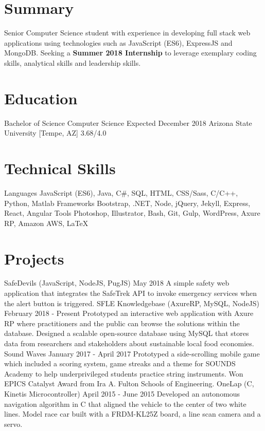 \section{Summary}
\sectionStart
  \summaryText
  {Senior Computer Science student with experience in developing full stack web applications using technologies such as JavaScript (ES6), ExpressJS and MongoDB. Seeking a \textbf{Summer 2018 Internship} to leverage exemplary coding skills, analytical skills and leadership skills.}
\sectionEnd

\section{Education}
\sectionStart
  \educationItem
    {Bachelor of Science}
    {Computer Science}
    {Expected December 2018}
    {Arizona State University [Tempe, AZ]}
    {3.68/4.0}
\sectionEnd

\section{Technical Skills}
\sectionStart
  \skillItem
    {Languages}
    {JavaScript (ES6), Java, C\#, SQL, HTML, CSS/Sass, C/C++, Python, Matlab}
  \skillItem
    {Frameworks}
    {Bootstrap, .NET, Node, jQuery, Jekyll, Express, React, Angular}
  \skillItem
    {Tools}
    {Photoshop, Illustrator, Bash, Git, Gulp, WordPress, Axure RP, Amazon AWS, \LaTeX\ }
  \vspace{3pt}
\sectionEnd

\section{Projects}
\sectionStart
  \projectHeading
    {}
    {SafeDevils}
    {(JavaScript, NodeJS, PugJS)}
    {May 2018}
  \listStart
    \bulletItem
      {A simple safety web application that integrates the SafeTrek API to invoke emergency services when the alert button is triggered.}
  \listEnd
  \projectHeading
    {}
    {SFLE Knowledgebase}
    {(AxureRP, MySQL, NodeJS)}
    {February 2018 - Present}
  \listStart
    \bulletItem
      {Prototyped an interactive web application with Axure RP where practitioners and the public can browse the solutions within the database.}
    \bulletItem
      {Designed a scalable open-source database using MySQL that stores data from researchers and stakeholders about sustainable local food economies.}
  \listEnd
  \projectHeading
    {}
    {Sound Waves}
    {}
    {January 2017 - April 2017}
  \listStart
    \bulletItem
      {Prototyped a side-scrolling mobile game which included a scoring system, game streaks and a theme for SOUNDS Academy to help underprivileged students practice string instruments.}
    \bulletItem
      {Won EPICS Catalyst Award from Ira A. Fulton Schools of Engineering.}
  \listEnd
  \projectHeading
    {}
    {OneLap}
    {(C, Kinetis Microcontroller)}
    {April 2015 - June 2015}
  \listStart
    \bulletItem
      {Developed an autonomous navigation algorithm in C that aligned the vehicle to the center of two white lines. Model race car built with a FRDM-KL25Z board, a line scan camera and a servo.}
  \listEnd
\sectionEnd

